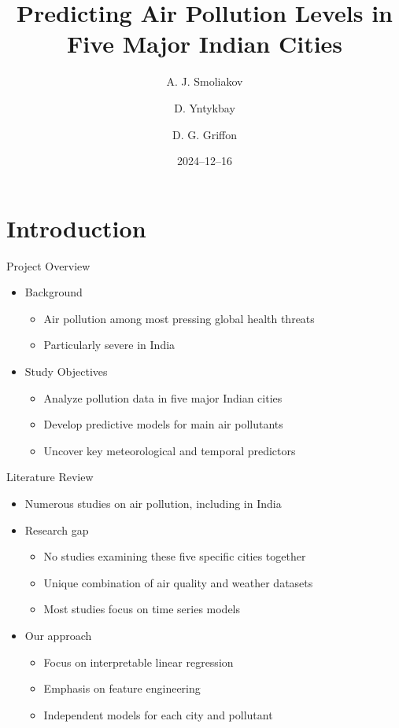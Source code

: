 \documentclass[svgnames, 12pt]{beamer}
\title[Air Pollution in India]{Predicting Air Pollution Levels in Five Major Indian Cities}
\author{A. J. Smoliakov \and D. Yntykbay \and D. G. Griffon}
\institute[VU]{Data Science Study Programme\\Faculty of Mathematics and Informatics}
\date{2024--12--16}
\begin{document}
\begin{frame}
\titlepage
\end{frame}


\section{Introduction}

\begin{frame}{Project Overview}
    \begin{itemize}
        \item Background
            \begin{itemize}
                \item Air pollution among most pressing global health threats
                \item Particularly severe in India
            \end{itemize}
        \vspace{1em}
        \item Study Objectives
            \begin{itemize}
                \item Analyze pollution data in five major Indian cities
                \item Develop predictive models for main air pollutants
                \item Uncover key meteorological and temporal predictors
            \end{itemize}
    \end{itemize}
    \vfill
 \end{frame}


\begin{frame}{Literature Review}
    \begin{itemize}
        \item Numerous studies on air pollution, including in India
        \item Research gap
            \begin{itemize}
                \item No studies examining these five specific cities together
                \item Unique combination of air quality and weather datasets
                \item Most studies focus on time series models
            \end{itemize}
        \item Our approach
            \begin{itemize}
                \item Focus on interpretable linear regression
                \item Emphasis on feature engineering
                \item Independent models for each city and pollutant
            \end{itemize}
    \end{itemize}
\end{frame}
\end{document}
